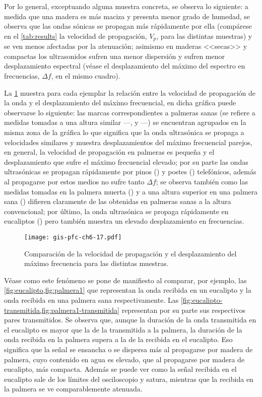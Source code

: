 Por lo general, exceptuando alguna muestra concreta, se observa lo
siguiente: a medida que una madera es más maciza y presenta menor grado de
humedad, se observa que las ondas sónicas se propagan más rápidamente por
ella (compárese en el \cref{tab:results} la velocidad de propagación,
$V_p$, para las distintas muestras) y se ven menos afectadas por la
atenuación; asimismo en maderas <<secas>> y compactas los ultrasonidos
sufren una menor dispersión y sufren menor desplazamiento espectral (véase
el desplazamiento del máximo del espectro en frecuencias, $\Delta f$, en el
mismo cuadro).

La \cref{fig:velfreq} muestra para cada ejemplar la relación entre la
velocidad de propagación de la onda y el desplazamiento del máximo
frecuencial, en dicha gráfica puede observarse lo siguiente: las marcas
correspondientes a palmeras sanas (se refiere a medidas tomadas a una
altura similar ---,  y ---) se encuentran
agrupados en la misma zona de la gráfica lo que significa que la onda
ultrasónica se propaga a velocidades similares y muestra desplazamientos
del máximo frecuencial parejos, en general, la velocidad de propagación en
palmeras es pequeña y el desplazamiento que sufre el máximo frecuencial
elevado; por su parte las ondas ultrasónicas se propagan rápidamente por
pinos () y postes () telefónicos, además al propagarse
por estos medios no sufre tanto $\Delta f$; se observa también como las
medidas tomadas en la palmera muerta () y a una altura superior
en una palmera sana () difieren claramente de las obtenidas en
palmeras sanas a la altura convencional; por último, la onda ultrasónica se
propaga rápidamente en eucaliptos () pero también muestra un
elevado desplazamiento en frecuencias.

\begin{figure}
    \begin{center}
	\texttt{[image: gis-pfc-ch6-17.pdf]}
    \end{center}
    \caption[Comparación de la $V_p$ y el $\Delta f$ para las distintas
    muestras.]{Comparación de la velocidad de propagación y el
    desplazamiento del máximo frecuencia para las distintas muestras.}
    \label{fig:velfreq}
\end{figure}

Véase como este fenómeno se pone de manifiesto al comparar, por ejemplo,
las \cref{fig:eucalipto,fig:palmera1} que representan la onda recibida en
un eucalipto y la onda recibida en una palmera sana respectivamente. Las
\cref{fig:eucalipto-transmitida,fig:palmera1-transmitida} representan por
su parte sus respectivos pares transmitidos. Se observa que, aunque la
duración de la onda transmitida en el eucalipto es mayor que la de la
transmitida a la palmera, la duración de la onda recibida en la palmera
supera a la de la recibida en el eucalipto. Eso significa que la señal se
ensancha o se dispersa más al propagarse por madera de palmera, cuyo
contenido en agua es elevado, que al propagarse por madera de eucalipto,
más compacta. Además se puede ver como la señal recibida en el eucalipto
sale de los límites del osciloscopio y satura, mientras que la recibida en
la palmera se ve comparablemente atenuada.

